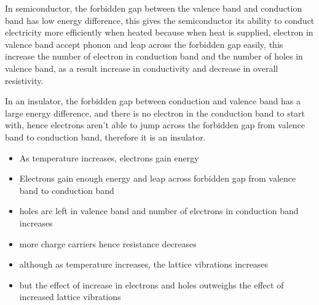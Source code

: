 \documentclass{article}
\begin{document}
In semiconductor, the forbidden gap between the valence band and conduction band has low energy difference, this gives the semiconductor its ability to conduct electricity more efficiently when heated because when heat is supplied, electron in valence band accept phonon and leap across the forbidden gap easily, this increase the number of electron in conduction band and the number of holes in valence band, as a result increase in conductivity and decrease in overall resistivity.

In an insulator, the forbidden gap between conduction and valence band has a large energy difference, and there is no electron in the conduction band to start with, hence electrons aren't able to jump across the forbidden gap from valence band to conduction band, therefore it is an insulator.
 
 
 \begin{tcolorbox}[colframe=black!20!white,title=\color{red}{****Explain why as temperature increases, the electrical conductivity of a semiconductor increases/ resistance of a semiconductor decreases. (5-6m)}]
\begin{itemize}
\color{red}
    \item As temperature increases, electrons gain energy
    \item Electrons gain enough energy and leap across forbidden gap from valence band to conduction band
    \item holes are left in valence band and number of electrons in conduction band increases
    \item more charge carriers hence resistance decreases
    \item although as temperature increases, the lattice vibrations increases
    \item but the effect of increase in electrons and holes outweighs the effect of increased lattice vibrations
\end{itemize}
\end{tcolorbox}
 
\end{document}
